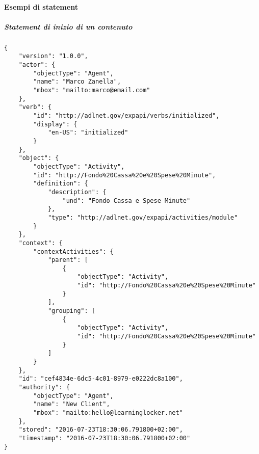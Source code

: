 \paragraph{Esempi di statement}
    \subparagraph*{Statement di inizio di un contenuto}\hfill \break
    \begin{lstlisting}
{
    "version": "1.0.0",
    "actor": {
        "objectType": "Agent",
        "name": "Marco Zanella",
        "mbox": "mailto:marco@email.com"
    },
    "verb": {
        "id": "http://adlnet.gov/expapi/verbs/initialized",
        "display": {
            "en-US": "initialized"
        }
    },
    "object": {
        "objectType": "Activity",
        "id": "http://Fondo%20Cassa%20e%20Spese%20Minute",
        "definition": {
            "description": {
                "und": "Fondo Cassa e Spese Minute"
            },
            "type": "http://adlnet.gov/expapi/activities/module"
        }
    },
    "context": {
        "contextActivities": {
            "parent": [
                {
                    "objectType": "Activity",
                    "id": "http://Fondo%20Cassa%20e%20Spese%20Minute"
                }
            ],
            "grouping": [
                {
                    "objectType": "Activity",
                    "id": "http://Fondo%20Cassa%20e%20Spese%20Minute"
                }
            ]
        }
    },
    "id": "cef4834e-6dc5-4c01-8979-e0222dc8a100",
    "authority": {
        "objectType": "Agent",
        "name": "New Client",
        "mbox": "mailto:hello@learninglocker.net"
    },
    "stored": "2016-07-23T18:30:06.791800+02:00",
    "timestamp": "2016-07-23T18:30:06.791800+02:00"
}
    \end{lstlisting}

